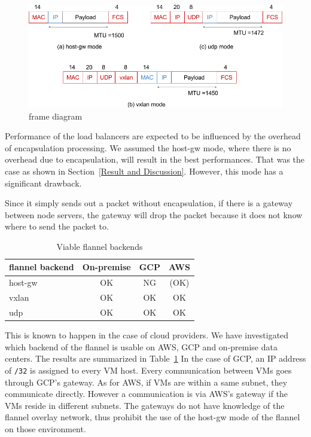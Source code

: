 \begin{figure}
\includegraphics[width=\columnwidth]{Figs/flannel-packet-diagram}
\caption{frame diagram}
\label{fig:flannel-packet-diagram}
\end{figure}

Performance of the load balancers are expected to be influenced by the overhead of encapsulation processing.
We assumed the host-gw mode, where there is no overhead due to encapsulation, will result in the best performances.
That was the case as shown in Section~\ref{Result and Discussion}.
However, this mode has a significant drawback.

Since it simply sends out a packet without encapsulation, 
if there is a gateway between node servers, 
the gateway will drop the packet because it does not know where to send the packet to.

\begin{table}
  \begin{tabular}{lccc}
    \toprule
    flannel backend & On-premise & GCP & AWS \\
    \midrule
    host-gw & OK & NG & (OK) \\
    vxlan & OK & OK & OK \\
    udp & OK & OK & OK \\
    \bottomrule
\end{tabular}
  \caption{Viable flannel backends}
  \label{tab:Viable flannel backends}
\end{table}

This is known to happen in the case of cloud providers.  
We have investigated which backend of the flannel is usable on AWS, GCP and on-premise data centers.
The results are summarized in Table~\ref{tab:Viable flannel backends}
%
In the case of GCP, an IP address of {\tt /32} is assigned to every VM host.
Every communication between VMs goes through GCP's gateway.
As for AWS, if VMs are within a same subnet, they communicate directly.
However a communication is via AWS's gateway if the VMs reside in different subnets.
The gateways do not have knowledge of the flannel overlay network, 
thus prohibit the use of the host-gw mode of the flannel on those environment.  

